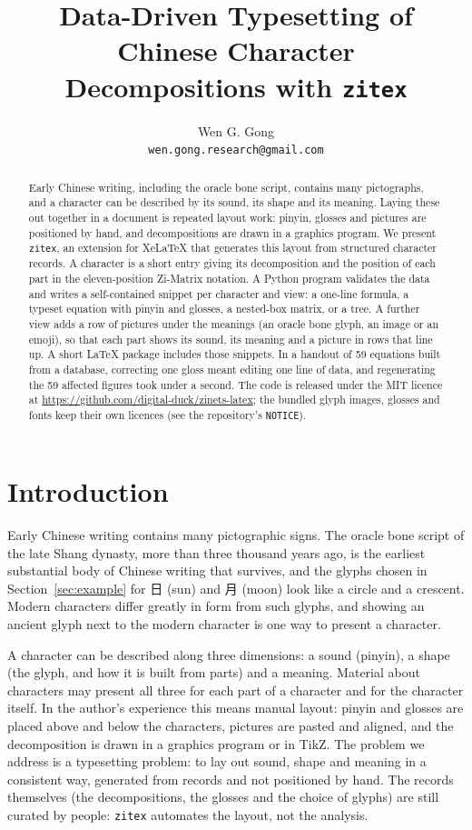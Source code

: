 \documentclass[11pt]{article}
\title{Data-Driven Typesetting of Chinese Character\\ Decompositions with \texttt{zitex}}
\author{Wen G. Gong\\ \texttt{wen.gong.research@gmail.com}}
\date{}
\begin{document}
\maketitle

\begin{abstract}
Early Chinese writing, including the oracle bone script, contains many pictographs, and a character can be described by its sound,
its shape and its meaning. Laying these out together in a document is repeated layout work: pinyin, glosses and pictures are
positioned by hand, and decompositions are drawn in a graphics program. We present \texttt{zitex}, an extension for XeLaTeX that
generates this layout from structured character records. A character is a short entry giving its decomposition and the position of each
part in the eleven-position Zi-Matrix notation. A Python program validates the data and writes a self-contained snippet per character and
view: a one-line formula, a typeset equation with pinyin and glosses, a nested-box matrix, or a tree. A further view adds a row of pictures
under the meanings (an oracle bone glyph, an image or an emoji), so that each part shows its sound, its meaning and a picture in rows that
line up. A short \LaTeX{} package includes those snippets. In a handout of 59 equations built from a database, correcting one gloss meant editing one
line of data, and regenerating the 59 affected figures took under a second. The code is released under the MIT licence at
\url{https://github.com/digital-duck/zinets-latex}; the bundled glyph images, glosses and fonts keep their own licences (see the repository's
\texttt{NOTICE}).
\end{abstract}

\section{Introduction}
Early Chinese writing contains many pictographic signs. The oracle bone script of the late Shang dynasty, more than three thousand years
ago, is the earliest substantial body of Chinese writing that survives, and the glyphs chosen in Section~\ref{sec:example} for 日 (sun) and
月 (moon) look like a circle and a crescent. Modern characters differ greatly in form from such glyphs, and showing an ancient glyph next to
the modern character is one way to present a character.

A character can be described along three dimensions: a sound (pinyin), a shape (the glyph, and how it is built from parts) and a meaning.
Material about characters may present all three for each part of a character and for the character itself. In the author's experience this
means manual layout: pinyin and glosses are placed above and below the characters, pictures are pasted and aligned, and the decomposition is
drawn in a graphics program or in TikZ. The problem we address is a typesetting problem: to lay out sound, shape and meaning in a consistent
way, generated from records and not positioned by hand. The records themselves (the decompositions, the glosses and the choice of glyphs)
are still curated by people: \texttt{zitex} automates the layout, not the analysis.
\end{document}
